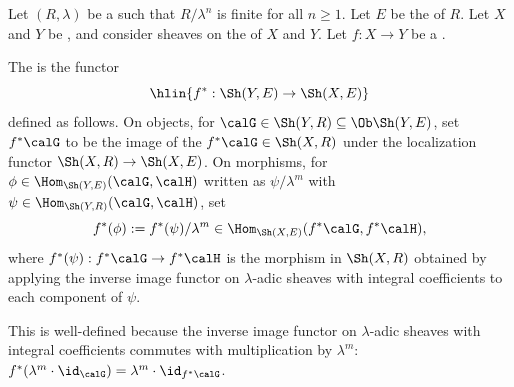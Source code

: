\begin{definition} \label{definition:inverse_image_functor_on_etale_sheaves_with_rational_adic_coefficients_on_a_noetherian_scheme}
Let $(R, \lambda)$ be a   such that $R/\lambda^n$ is finite for all $n \geq 1$. Let $E$ be the  of $R$. Let $X$ and $Y$ be , and consider sheaves on the  of $X$ and $Y$. Let $f: X \to Y$ be a .

The  is the functor
$$\hlin{f^* : \Sh(Y, E) \to \Sh(X, E)}$$
defined as follows. On objects, for $\calG \in \Sh(Y, R) \subseteq \Ob \Sh(Y, E)$, set $f^* \calG$ to be the image of the  $f^* \calG \in \Sh(X, R)$ under the localization functor $\Sh(X, R) \to \Sh(X, E)$. On morphisms, for $\phi \in \Hom_{\Sh(Y, E)}(\calG, \calH)$ written as $\psi / \lambda^m$ with $\psi \in \Hom_{\Sh(Y, R)}(\calG, \calH)$, set
$$f^* (\phi) := f^*(\psi) / \lambda^m \in \Hom_{\Sh(X, E)}(f^* \calG, f^* \calH),$$
where $f^*(\psi): f^* \calG \to f^* \calH$ is the morphism in $\Sh(X, R)$ obtained by applying the inverse image functor on $\lambda$-adic sheaves with integral coefficients to each component of $\psi$.

This is well-defined because the inverse image functor on $\lambda$-adic sheaves with integral coefficients commutes with multiplication by $\lambda^m$: $f^*(\lambda^m \cdot \id_\calG) = \lambda^m \cdot \id_{f^* \calG}$.
\end{definition}
